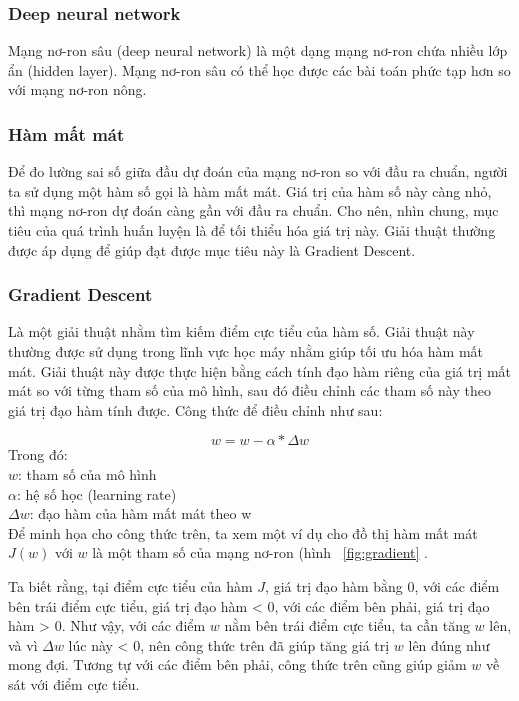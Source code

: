 \documentclass[a4paper,14pt]{extreport}
\begin{document}
\subsubsection*{Deep neural network }
Mạng nơ-ron sâu (deep neural network) là một dạng mạng nơ-ron chứa nhiều lớp ẩn (hidden layer). 
Mạng nơ-ron sâu có thể học được các bài toán phức tạp hơn so với mạng nơ-ron nông.

\subsubsection*{ Hàm mất mát }
Để đo lường sai số giữa đầu dự đoán của mạng nơ-ron so với đầu ra chuẩn, người ta sử dụng một hàm số gọi là hàm mất mát.
 Giá trị của hàm số này càng nhỏ, thì mạng nơ-ron dự đoán càng gần với đầu ra chuẩn. Cho nên, nhìn chung, 
 mục tiêu của quá trình huấn luyện là để tối thiểu hóa giá trị này. Giải thuật thường được áp dụng để giúp đạt 
 được mục tiêu này là Gradient Descent.

\subsubsection*{ Gradient Descent }
Là một giải thuật nhằm tìm kiếm điểm cực tiểu của hàm số. Giải thuật này thường được sử dụng trong lĩnh 
vực học máy nhằm giúp tối ưu hóa hàm mất mát. Giải thuật này được thực hiện bằng cách tính đạo hàm riêng 
của giá trị mất mát so với từng tham số của mô hình, sau đó điều chỉnh các tham số này theo giá trị đạo hàm tính được. 
Công thức để điều chỉnh như sau:

\[ w = w - \alpha * \Delta w\]
Trong đó: \\
$ w $: tham số của mô hình \\
$ \alpha $: hệ số học (learning rate) \\
$ \Delta w $: đạo hàm của hàm mất mát theo w \\

Để minh họa cho công thức trên, ta xem một ví dụ cho đồ thị hàm mất mát $J(w)$ với $w$ là một tham số của mạng nơ-ron (hình ~\ref{fig:gradient} . \cite{gradient-descent}

Ta biết rằng, tại điểm cực tiểu của hàm $J$, giá trị đạo hàm bằng 0, với các điểm bên trái điểm cực tiểu, giá trị đạo hàm < 0, với các điểm bên phải, giá trị đạo hàm > 0. Như vậy, với các điểm $w$ nằm bên trái điểm cực tiểu, ta cần tăng $w$ lên, và vì $\Delta w$ lúc này < 0, nên công thức trên đã giúp tăng giá trị $w$ lên đúng như mong đợi. Tương tự với các điểm bên phải, công thức trên cũng giúp giảm $w$ về sát với điểm cực tiểu.
\end{document}
